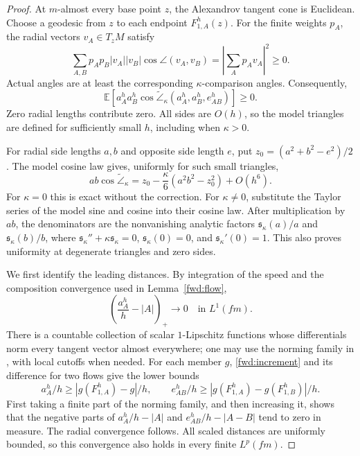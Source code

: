 \begin{proof}
At \(m\)-almost every base point \(z\), the Alexandrov tangent cone
is Euclidean. Choose a geodesic from \(z\) to each endpoint
\(F^h_{1,A}(z)\). For the finite weights \(p_A\), the radial vectors
\(v_A\in T_zM\) satisfy
\[
 \sum_{A,B}p_Ap_B|v_A||v_B|\cos\angle(v_A,v_B)
 =\left|\sum_Ap_Av_A\right|^2\geq0.
\]
Actual angles are at least the corresponding \(\kappa\)-comparison
angles. Consequently,
\begin{equation}
\label{fwd:cosine-sum}
 \mathbb E\!\left[
 a^h_Aa^h_B\cos\widetilde\angle_\kappa
          (a^h_A,a^h_B,e^h_{AB})\right]\geq0.
\end{equation}
Zero radial lengths contribute zero. All sides are \(O(h)\), so the
model triangles are defined for sufficiently small \(h\), including
when \(\kappa>0\).

For radial side lengths \(a,b\) and opposite side length \(e\), put
\(z_0=(a^2+b^2-e^2)/2\). The model cosine law gives, uniformly for
such small triangles,
\begin{equation}
\label{fwd:model-expansion}
 ab\cos\widetilde\angle_\kappa
 =z_0-\frac\kappa6(a^2b^2-z_0^2)+O(h^6).
\end{equation}
For \(\kappa=0\) this is exact without the correction. For
\(\kappa\ne0\), substitute the Taylor series of the model sine and
cosine into their cosine law. After multiplication by \(ab\), the
denominators are the nonvanishing analytic factors
\(\mathfrak s_\kappa(a)/a\) and
\(\mathfrak s_\kappa(b)/b\), where
\(\mathfrak s_\kappa''+\kappa\mathfrak s_\kappa=0\),
\(\mathfrak s_\kappa(0)=0\), and
\(\mathfrak s_\kappa'(0)=1\). This also proves uniformity at
degenerate triangles and zero sides.

We first identify the leading distances. By integration of the speed
and the composition convergence used in Lemma~\ref{fwd:flow},
\[
 \left(\frac{a^h_A}{h}-|A|\right)_+
 \longrightarrow0\quad\text{in }L^1(fm).
\]
There is a countable collection of scalar \(1\)-Lipschitz functions
whose differentials norm every tangent vector almost everywhere;
one may use the norming family in
\cite[Lemma 9.2]{AmbrosioTrevisan2014}, with local cutoffs when needed.
For each member \(g\), \eqref{fwd:increment} and its difference for
two flows give the lower bounds
\[
 a^h_A/h\geq
 |g(F^h_{1,A})-g|/h,\qquad
 e^h_{AB}/h\geq
 |g(F^h_{1,A})-g(F^h_{1,B})|/h.
\]
First taking a finite part of the norming family, and then increasing
it, shows that the negative parts of
\(a^h_A/h-|A|\) and \(e^h_{AB}/h-|A-B|\) tend to zero in measure.
The radial convergence follows. All scaled distances are uniformly
bounded, so this convergence also holds in every finite \(L^p(fm)\).


\end{proof}
